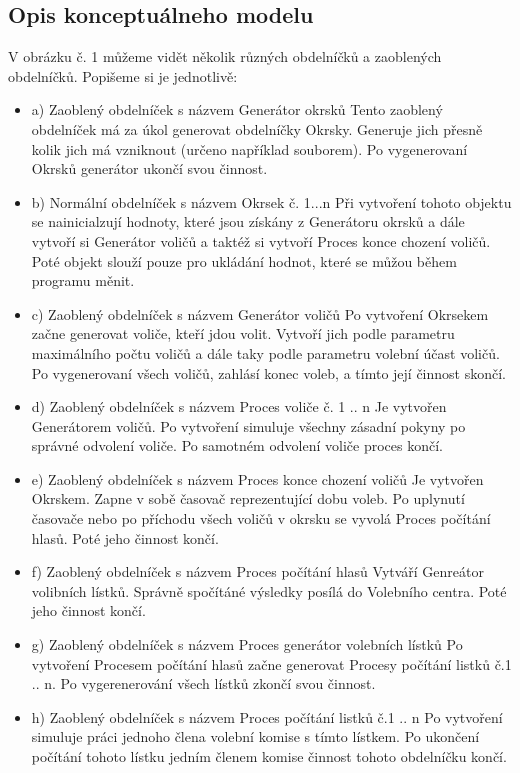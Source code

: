 \documentclass[12pt,a4paper,titlepage,final]{article}
\begin{document}
\subsection{Opis konceptuálneho modelu}
 V obrázku č. 1 můžeme vidět několik různých obdelníčků a zaoblených obdelníčků. Popišeme si je jednotlivě:	
 \begin{itemize}
\item 	a) Zaoblený obdelníček s názvem Generátor okrsků
\subitem	 Tento zaoblený obdelníček má za úkol generovat obdelníčky Okrsky. Generuje jich přesně kolik jich má vzniknout (určeno například souborem). Po vygenerovaní Okrsků generátor ukončí svou činnost.
\item 	b) Normální obdelníček s názvem Okrsek č. 1...n
\subitem	 Při vytvoření tohoto objektu  se nainicialzují hodnoty, které jsou získány z Generátoru okrsků a dále vytvoří si Generátor voličů a taktéž si vytvoří Proces konce chození voličů. Poté objekt slouží pouze pro ukládání hodnot, které se můžou během programu měnit.
\item 	c) Zaoblený obdelníček s názvem Generátor voličů
\subitem	 Po vytvoření Okrsekem začne generovat voliče, kteří jdou volit. Vytvoří jich podle parametru maximálního počtu voličů a dále taky podle parametru volební účast voličů. Po vygenerovaní všech voličů, zahlásí konec voleb, a tímto její činnost skončí. 
\item 	d) Zaoblený obdelníček s názvem Proces voliče č. 1 .. n
\subitem	 Je vytvořen Generátorem voličů. Po vytvoření simuluje všechny zásadní pokyny po správné odvolení voliče. Po samotném odvolení voliče proces končí.
 \item	e) Zaoblený obdelníček s názvem Proces konce chození voličů
\subitem	 Je vytvořen Okrskem. Zapne v sobě časovač reprezentující dobu voleb. Po uplynutí časovače nebo po příchodu všech voličů v okrsku se vyvolá Proces počítání hlasů. Poté jeho činnost končí.
\item 	f) Zaoblený obdelníček s názvem Proces počítání hlasů
\subitem	 Vytváří Genreátor volibních lístků. Správně spočítáné výsledky posílá do Volebního centra. Poté jeho činnost končí.
\item 	g) Zaoblený obdelníček s názvem Proces generátor volebních lístků
\subitem	 Po vytvoření Procesem počítání hlasů začne generovat Procesy počítání listků č.1 .. n. Po vygerenerování všech lístků zkončí svou činnost.
\item 	h) Zaoblený obdelníček s názvem Proces počítání listků č.1 .. n
\subitem	 Po vytvoření simuluje práci jednoho člena volební komise s tímto lístkem. Po ukončení počítání tohoto lístku jedním členem komise činnost tohoto obdelníčku končí.
\end{itemize}
\end{document}
